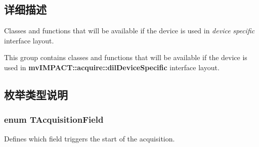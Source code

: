 \subsection{详细描述}
Classes and functions that will be available if the device is used in {\itshape device} {\itshape specific} interface layout. 

This group contains classes and functions that will be available if the device is used in {\bfseries mv\+I\+M\+P\+A\+C\+T\+::acquire\+::dil\+Device\+Specific} interface layout. 

\subsection{枚举类型说明}
\hypertarget{group___device_specific_interface_gac2b87599c04c1ca9aa8c8a412c8a5518}{
\subsubsection[{T\+Acquisition\+Field}]{\setlength{\rightskip}{0pt plus 5cm}enum {\bf T\+Acquisition\+Field}}}\label{group___device_specific_interface_gac2b87599c04c1ca9aa8c8a412c8a5518}


Defines which field triggers the start of the acquisition. 

